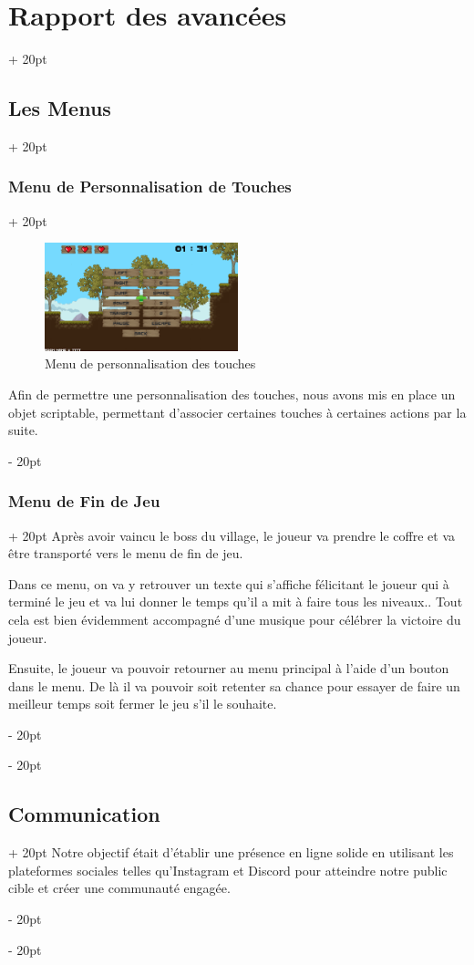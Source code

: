 \documentclass[a4paper, 12pt, twoside]{article}
\newcommand{\ind}[1][20pt]{\advance\leftskip + #1}
\newcommand{\deind}[1][20pt]{\advance\leftskip - #1}
\newenvironment{indt}[2][20pt]{#2 \par \ind[#1]}{\par \deind} %
\begin{document}
\begin{indt}{\section{Rapport des avancées}}
\begin{indt}{\subsection{Les Menus}}
\begin{indt}{\subsubsection{Menu de Personnalisation de Touches}}
                \begin{figure}[h]
                    \centering
                    \includegraphics[width=0.5\textwidth]{Menu3.png}
                    \caption{Menu de personnalisation des touches}
                    \label{fig:mesh1}
                \end{figure}

                Afin de permettre une personnalisation des touches, nous avons mis en place un objet scriptable, permettant d'associer certaines touches à certaines actions par la suite.
            \end{indt}

            \begin{indt}{\subsubsection{Menu de Fin de Jeu}}
                Après avoir vaincu le boss du village, le joueur va prendre le coffre et va être transporté vers le menu de fin de jeu.

                Dans ce menu, on va y retrouver un texte qui s’affiche félicitant le joueur qui à terminé le jeu et va lui donner le temps qu’il a mit à faire tous les niveaux.. Tout cela est bien évidemment accompagné d’une musique pour célébrer la victoire du joueur.

                Ensuite, le joueur va pouvoir retourner au menu principal à l’aide d’un bouton dans le menu. De là il va pouvoir soit retenter sa chance pour essayer de faire un meilleur temps soit fermer le jeu s’il le souhaite.
            \end{indt}
        \end{indt}

        \begin{indt}{\subsection{Communication}}
            Notre objectif était d'établir une présence en ligne solide en utilisant les plateformes sociales telles qu'Instagram et Discord pour atteindre notre public cible et créer une communauté engagée.


\end{indt}
\end{indt}
\end{document}
